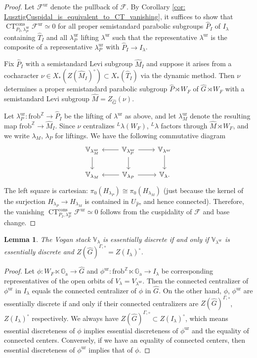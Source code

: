 \documentclass{amsart}
\newtheorem{lemma}[theorem]{Lemma}
\theoremstyle{definition}
\theoremstyle{remark}
\numberwithin{equation}{section}
\newcommand{\mc}{\mathcal}
\newcommand{\Z}{\mathbb{Z}}
\newcommand{\wh}{\widehat}
\newcommand{\frob}{\mathrm{frob}}
\DeclareMathOperator{\CT}{\mathrm{CT}}
\newcommand{\ur}{\mathrm{ur}}
\newcommand{\V}{\mathbb{V}}
\newcommand{\Ga}{\mathbb{G}_{\mathrm{a}}}
\begin{document}
\begin{proof}
Let $\mc F^{\ur}$ denote the pullback of $\mc F$. By Corollary \ref{cor: LusztigCuspidal_is_equivalent_to_CT_vanishing}, it suffices to show that $\CT^{\mathrm{cons}}_{P_{I},\lambda_{P}^{\ur}} \mc F^{\ur}\simeq 0$ for all proper semistandard parabolic subgroups $\wh P_I$ of $I_\lambda$ containing $\wh T_I$ and all $\lambda_P^{\ur}$ lifting $\lambda^\ur$ such that the representative $\lambda^\ur$ is the composite of a representative $\lambda^\ur_P$ with $\wh P_I\to I_\lambda$. 

Fix $\wh P_{I}$ with a semistandard Levi subgroup $\wh M_{I}$ and suppose it arises from a cocharacter $\nu\in X_*(Z(\wh M_{I})^\circ)\subset X_*(\wh T_I)$ via the dynamic method. Then $\nu$ determines a proper semistandard parabolic subgroup $\wh P\rtimes W_F$ of $\wh G\rtimes W_F$ with a semistandard Levi subgroup $\wh M=Z_{\wh G}(\nu)$. 

Let $\lambda_{P}^\ur\colon \frob^\Z\to \wh P_{I}$ be the lifting of $\lambda^\ur$ as above, and let $\lambda_{M}^\ur$ denote the resulting map $\frob^\Z\to \wh M_{I}$. Since $\nu$ centralizes ${}^L\lambda (W_F)$, ${}^L \lambda$ factors through $\wh M\rtimes W_F$, and we write $\lambda_M$, $\lambda_P$ for liftings. We have the following commutative diagram
\[
\begin{tikzcd}
    \V_{\lambda_{M}^{\ur}} \arrow[d] & \arrow[l] \V_{\lambda_{P}^{\ur}} \arrow[d] \arrow[r] & \V_{\lambda^{\ur}} \arrow[d] \\
    \V_{\lambda_M}  & \arrow[l] \V_{\lambda_P} \arrow[r] & \V_{\lambda}. 
\end{tikzcd}
\]
The left square is cartesian: $\pi_0 (H_{\lambda_P})\cong \pi_0 (H_{\lambda_M})$ (just because the kernel of the surjection $H_{\lambda_P}\to H_{\lambda_M}$ is contained in $U_{\wh P}$, and hence connected). Therefore, the vanishing $\CT^{\mathrm{cons}}_{P_I,\lambda_{P}^{\ur}} \mc F^{\ur}\simeq 0$ follows from the cuspidality of $\mc F$ and base change. 
\end{proof}

\begin{lemma}{\label{lem: GIcenters}}
The Vogan stack $\V_{\lambda}$ is essentially discrete if and only if $\V_{\lambda^{\ur}}$ is essentially discrete and $Z(\wh{G})^{\Gamma, \circ} = Z(I_{\lambda})^{\circ}$.
\end{lemma}
\begin{proof}
Let $\phi\colon W_F \ltimes\Ga\to \wh G$ and $\phi^\ur\colon \frob^\Z\ltimes \Ga\to I_\lambda$ be corresponding representatives of the open orbits of $V_\lambda=V_{\lambda^\ur}$. Then the connected centralizer of $\phi^\ur$ in $I_{\lambda}$ equals the connected centralizer of $\phi$ in $\wh{G}$. On the other hand, $\phi$, $\phi^\ur$ are essentially discrete if and only if their connected centralizers are $Z(\wh{G})^{\Gamma, \circ}$, $Z(I_{\lambda})^{\circ}$ respectively. We always have $Z(\wh{G})^{\Gamma, \circ} \subset Z(I_{\lambda})^{\circ}$, which means essential discreteness of $\phi$ implies essential discreteness of $\phi^\ur$ and the equality of connected centers. Conversely, if we have an equality of connected centers, then essential discreteness of $\phi^\ur$ implies that of $\phi$. 
\end{proof}
\end{document}
